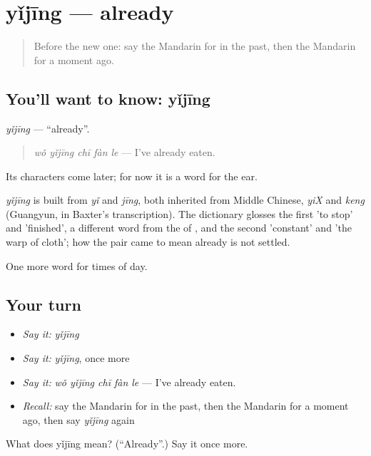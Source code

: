 \section[yǐjīng]{yǐjīng — already}

\label{lesson:ZH-C126-yijing}



\begin{quote}
Before the new one: say the Mandarin for in the past, then the Mandarin for a moment ago.
\end{quote}

\subsection*{You'll want to know: yǐjīng}
\emph{yǐjīng} — \textquotedblleft{}already\textquotedblright{}.

\begin{quote}
\emph{wǒ yǐjīng chī fàn le} — I've already eaten.
\end{quote}

Its characters come later; for now it is a word for the ear.

\begin{cousinweb}
\emph{yǐjīng} is built from \emph{yǐ} and \emph{jīng}, both inherited from Middle Chinese, \emph{yiX} and \emph{keng} (Guangyun, in Baxter's transcription). The dictionary glosses the first 'to stop' and 'finished', a different word from the  of , and the second 'constant' and 'the warp of cloth'; how the pair came to mean already is not settled.
\end{cousinweb}

\begin{grammarlens}[title={What you've built}]
One more word for times of day.
\end{grammarlens}

\subsection*{Your turn}
\begin{itemize}
\raggedright
  \item \emph{Say it:} \emph{yǐjīng}
  \item \emph{Say it:} \emph{yǐjīng}, once more
  \item \emph{Say it:} \emph{wǒ yǐjīng chī fàn le} — I've already eaten.
  \item \emph{Recall:} say the Mandarin for in the past, then the Mandarin for a moment ago, then say \emph{yǐjīng} again
\end{itemize}

\begin{tcolorbox}[breakable,colback=teal!4,colframe=teal!35!black,title={Before you move on}]
What does yǐjīng mean? (\textquotedblleft{}Already\textquotedblright{}.) Say it once more.
\end{tcolorbox}
